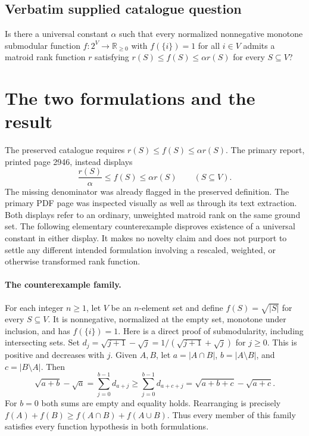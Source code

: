 \documentclass[11pt]{article}
\begin{document}
\subsection{Verbatim supplied catalogue question}
Is there a universal constant $\alpha$ such that every normalized nonnegative monotone submodular function $f:2^V\to\mathbb R_{\geq0}$ with $f(\{i\})=1$ for all $i\in V$ admits a matroid rank function $r$ satisfying $r(S)\leq f(S)\leq\alpha r(S)$ for every $S\subseteq V$?

\section{The two formulations and the result}
The preserved catalogue requires $r(S)\le f(S)\le\alpha r(S)$.
The primary report, printed page 2946, instead displays
\[
\frac{r(S)}\alpha\le f(S)\le\alpha r(S)\qquad(S\subseteq V).
\]
The missing denominator was already flagged in the preserved definition.
The primary PDF page was inspected visually as well as through its
text extraction. Both displays refer to an ordinary, unweighted
matroid rank on the same ground set. The following elementary
counterexample disproves existence of a universal constant in either
display. It makes no novelty claim and does not purport to settle
any different intended formulation involving a rescaled, weighted,
or otherwise transformed rank function.

\paragraph{The counterexample family.}
For each integer $n\ge1$, let $V$ be an $n$-element set and
define $f(S)=\sqrt{|S|}$ for every $S\subseteq V$.
It is nonnegative, normalized at the empty set, monotone under
inclusion, and has $f(\{i\})=1$. Here is a direct proof of
submodularity, including intersecting sets. Set
$d_j=\sqrt{j+1}-\sqrt j=1/(\sqrt{j+1}+\sqrt j)$ for $j\ge0$.
This is positive and decreases with $j$. Given $A,B$, let
$a=|A\cap B|$, $b=|A\setminus B|$, and $c=|B\setminus A|$.
Then
\[
\sqrt{a+b}-\sqrt a=\sum_{j=0}^{b-1}d_{a+j}
\ge\sum_{j=0}^{b-1}d_{a+c+j}
=\sqrt{a+b+c}-\sqrt{a+c}.
\]
For $b=0$ both sums are empty and equality holds. Rearranging
is precisely $f(A)+f(B)\ge f(A\cap B)+f(A\cup B)$.
Thus every member of this family satisfies every function hypothesis
in both formulations.
\end{document}
